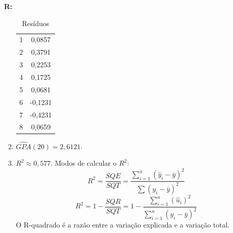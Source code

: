 \documentclass[12pt,letterpaper, onecolumn]{exam}
\renewenvironment{solution}
  {\par\noindent\textbf{R:}\enspace\color{blue}}
  {\par\color{black}}
\begin{document}
\begin{questions}
\begin{solution}
\begin{enumerate}[label = (\alph*)]
    \begin{table}[h]
            \centering
            \caption{Resíduos}
            \begin{tabular}{c|c}
            \toprule
            \midrule
               1  & 0,0857 \\
               2  &  0,3791\\
               3  &  0,2253\\
               4  &  0,1725\\
               5  &  0,0681\\
               6  &  -0,1231\\
               7  &  -0,4231\\
               8  &  0,0659\\
               \midrule
               \bottomrule
            \end{tabular}
            \label{tab:placeholder}
        \end{table}
\item $\widehat{GPA}(20)=2{,}6121$.
\item $R^2 \approx 0{,}577$. Modos de calcular o $R^2$:\begin{equation}
    R^2 = \frac{SQE}{SQT} = \frac{\sum^n_{i=1}(\hat y_i - \bar y)^2}{\sum(y_i - \bar y)^2}
\end{equation}
\begin{equation}
    R^2 = 1- \frac{SQR}{SQT} =1- \frac{\sum^n_{i=1}(\hat u_i )^2}{\sum^n_{i=1}(y_i - \bar y)^2}
\end{equation}
O R-quadrado é a razão entre a variação explicada e a variação total.
\end{enumerate}

\end{solution}


\end{questions}
\end{document}
